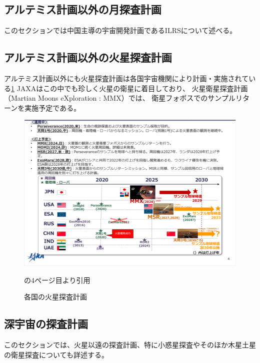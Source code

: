 \subsection{アルテミス計画以外の月探査計画}
\label{subsection:その他の月・火星探査計画}
このセクションでは中国主導の宇宙開発計画であるILRSについて述べる。

\subsection{アルテミス計画以外の火星探査計画}
\label{subsection:アルテミス計画以外の火星探査計画}
アルテミス計画以外にも火星探査計画は各国宇宙機関により計画・実施されている\ref{fig:mars_explorations}
JAXAはこの中でも珍しく火星の衛星に着目しており、
火星衛星探査計画（Martian Moons eXploration : MMX）では、
衛星フォボスでのサンプルリターンを実施予定である。

\begin{figure}[tbh]
    \centering
    \includegraphics[width=0.7\textheight]{img/mars_explorations.pdf}
    \caption{各国の火星探査計画}
    \label{fig:mars_explorations}
    \begin{minipage}{\textwidth}
        \centering
        \cite{isas2023}の4ページ目より引用
    \end{minipage}
\end{figure}


\subsection{深宇宙の探査計画}
\label{subsection:深宇宙の探査計画}
このセクションでは、火星以遠の探査計画、特に小惑星探査やそのほか木星土星の衛星探査についても詳述する。

